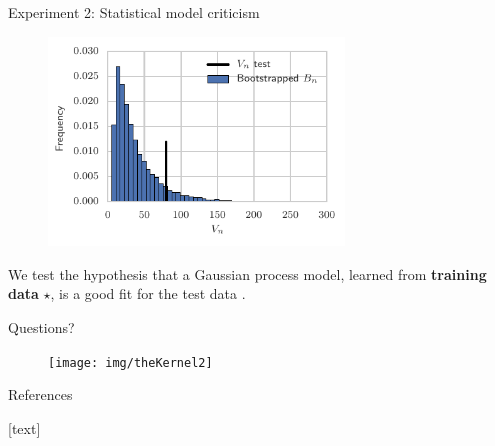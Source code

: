 \documentclass{beamer}
\begin{document}
   \begin{frame}{Experiment 2: Statistical model criticism}
        \begin{figure}
           \includegraphics[width=0.7\textwidth]{img/gp_regression_bootstrap_hist} 
        \end{figure}
We test the hypothesis that a Gaussian process {\color{red} model}, learned from \textbf{training data} $\star$, is a good fit for the {\color{blue} test data} \cite{lloyd2015statistical}.

   \end{frame}

   \begin{frame}{Questions?}
      \begin{figure}
\texttt{[image: img/theKernel2]} %
        \end{figure}   
   \end{frame}


   \begin{frame}{References}


\begin{minipage}{.9\linewidth}
{\tiny
[text] 
 
\tiny
 
} 
\end{minipage}
\end{frame}


 
\end{document}
